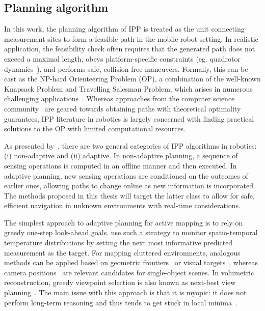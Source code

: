 \subsection{Planning algorithm}
In this work, the planning algorithm of IPP is treated as the unit connecting measurement sites to form a 
feasible path in the mobile robot setting. In realistic application, the feasibility check often requires 
that the generated path does not exceed a maximal length, obeys platform-specific constraints (eg. 
quadrotor dynamics~\cite{Richter2013}), and performs safe, collision-free maneuvers. Formally, this can be 
cast as the NP-hard Orienteering Problem (OP), a combination of the well-known Knapsack Problem and 
Travelling Salesman Problem, which arises in numerous challenging applications~\cite{Vansteenwegen2011}. 
Whereas approaches from the computer science community~\cite{Vansteenwegen2011, Chekuri2005} are geared 
towards obtaining paths with theoretical optimality guarantees, IPP literature in robotics is largely 
concerned with finding practical solutions to the OP with limited computational resources.

As presented by~\citet{Lim2015}, there are two general categories of IPP algorithms in robotics: (i) 
non-adaptive and (ii) adaptive. In non-adaptive planning, a sequence of sensing operations is computed in an 
offline manner and then executed. In adaptive planning, new sensing operations are conditioned on the 
outcomes of earlier ones, allowing paths to change online as new information is incorporated. The methods 
proposed in this thesis will target the latter class to allow for safe, efficient navigation in unknown 
environments with real-time considerations.

The simplest approach to adaptive planning for active mapping is to rely on greedy one-step look-ahead 
goals. \citet{Singh2010} use such a strategy to monitor spatio-temporal temperature distributions by setting 
the next most informative predicted measurement as the target. For mapping cluttered environments, analogous 
methods can be applied based on geometric frontiers~\cite{Yamauchi1997, Latombe2002, Bircher2016, Heng2014} 
or visual targets~\cite{Kim2014}, whereas camera positions~\cite{Isler2016} are relevant candidates for 
single-object scenes. In volumetric reconstruction, greedy viewpoint selection is also known as next-best 
view planning~\cite{Connolly1985}. The main issue with this approach is that it is myopic: it does 
not perform long-term reasoning and thus tends to get stuck in local minima~\cite{Lim2015, Charrow2015a}.

